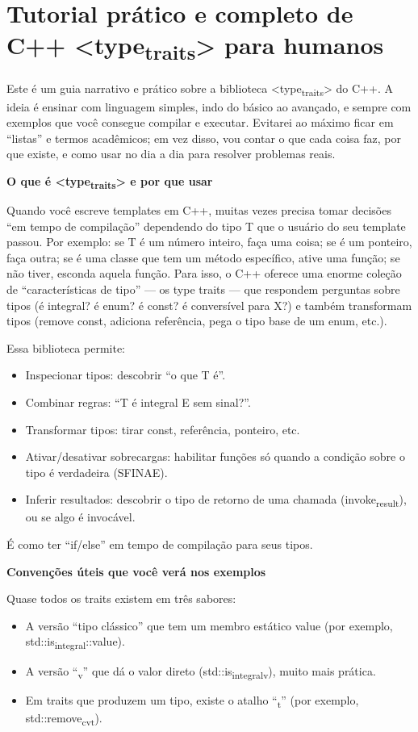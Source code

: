 \documentclass[11pt]{article}
\date{\today}
\title{}
\begin{document}
\tableofcontents

\section{Tutorial prático e completo de C++ <type\textsubscript{traits}> para humanos}
\label{sec:orgf06a40d}

Este é um guia narrativo e prático sobre a biblioteca <type\textsubscript{traits}> do C++. A ideia é ensinar com linguagem simples, indo do básico ao avançado, e sempre com exemplos que você consegue compilar e executar. Evitarei ao máximo ficar em “listas” e termos acadêmicos; em vez disso, vou contar o que cada coisa faz, por que existe, e como usar no dia a dia para resolver problemas reais.

\textbf{O que é <type\textsubscript{traits}> e por que usar}

Quando você escreve templates em C++, muitas vezes precisa tomar decisões “em tempo de compilação” dependendo do tipo T que o usuário do seu template passou. Por exemplo: se T é um número inteiro, faça uma coisa; se é um ponteiro, faça outra; se é uma classe que tem um método específico, ative uma função; se não tiver, esconda aquela função. Para isso, o C++ oferece uma enorme coleção de “características de tipo” — os type traits — que respondem perguntas sobre tipos (é integral? é enum? é const? é conversível para X?) e também transformam tipos (remove const, adiciona referência, pega o tipo base de um enum, etc.).

Essa biblioteca permite:
\begin{itemize}
\item Inspecionar tipos: descobrir “o que T é”.
\item Combinar regras: “T é integral E sem sinal?”.
\item Transformar tipos: tirar const, referência, ponteiro, etc.
\item Ativar/desativar sobrecargas: habilitar funções só quando a condição sobre o tipo é verdadeira (SFINAE).
\item Inferir resultados: descobrir o tipo de retorno de uma chamada (invoke\textsubscript{result}), ou se algo é invocável.
\end{itemize}

É como ter “if/else” em tempo de compilação para seus tipos.

\textbf{Convenções úteis que você verá nos exemplos}

Quase todos os traits existem em três sabores:
\begin{itemize}
\item A versão “tipo clássico” que tem um membro estático value (por exemplo, std::is\textsubscript{integral}::value).
\item A versão “\textsubscript{v}” que dá o valor direto (std::is\textsubscript{integral}\textsubscript{v}), muito mais prática.
\item Em traits que produzem um tipo, existe o atalho “\textsubscript{t}” (por exemplo, std::remove\textsubscript{cv}\textsubscript{t}).
\end{itemize}
\end{document}
